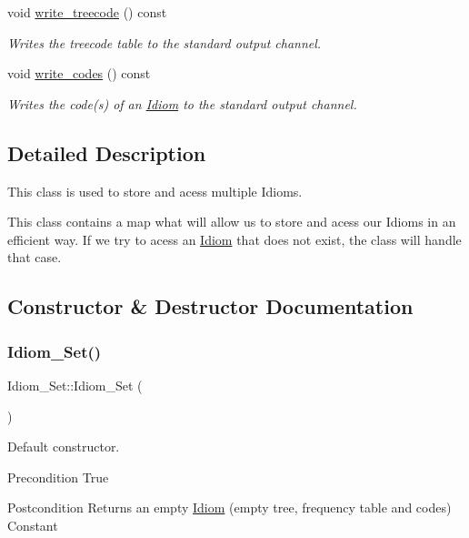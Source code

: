 \begin{DoxyCompactItemize}
void \hyperlink{classIdiom__Set_aca59902e54a6d5d39de5df7ebf8f8560}{write\+\_\+treecode} () const
\begin{DoxyCompactList}\small\item\em Writes the treecode table to the standard output channel. \end{DoxyCompactList}\item 
void \hyperlink{classIdiom__Set_a0240ca475c95b258678434dc14dc9c87}{write\+\_\+codes} () const
\begin{DoxyCompactList}\small\item\em Writes the code(s) of an \hyperlink{classIdiom}{Idiom} to the standard output channel. \end{DoxyCompactList}\end{DoxyCompactItemize}


\subsection{Detailed Description}
This class is used to store and acess multiple Idioms. 

This class contains a map what will allow us to store and acess our Idioms in an efficient way. If we try to acess an \hyperlink{classIdiom}{Idiom} that does not exist, the class will handle that case. 

\subsection{Constructor \& Destructor Documentation}
\mbox{\label{classIdiom__Set_a39d564382e43baccc4022d61f13da05a}} 
\subsubsection{\texorpdfstring{Idiom\+\_\+\+Set()}{Idiom\_Set()}}
{\footnotesize\ttfamily Idiom\+\_\+\+Set\+::\+Idiom\+\_\+\+Set (\begin{DoxyParamCaption}{ }\end{DoxyParamCaption})}



Default constructor. 

\begin{DoxyPrecond}{Precondition}
True 
\end{DoxyPrecond}
\begin{DoxyPostcond}{Postcondition}
Returns an empty \hyperlink{classIdiom}{Idiom} (empty tree, frequency table and codes)  Constant 
\end{DoxyPostcond}


